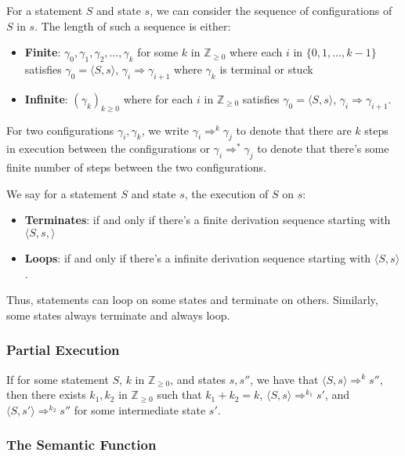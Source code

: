 \documentclass[a4paper, 12pt, twoside]{article}
\begin{document}
For a statement $S$ and state $s$, we can consider the sequence of
configurations of $S$ in $s$. The length of such a sequence is either:
\begin{itemize}
  \item \textbf{Finite}: $\gamma_0, \gamma_1, \gamma_2, \ldots, \gamma_k$
  for some $k$ in $\mathbb{Z}_{\geq 0}$ where each $i$ in $\{0, 1, \ldots, k - 1\}$ satisfies
  $\gamma_0 = \langle S, s \rangle$, $\gamma_i \Rightarrow \gamma_{i + 1}$ where
  $\gamma_k$ is terminal or stuck
  \item \textbf{Infinite}: $(\gamma_k)_{k \geq 0}$ where 
  for each $i$ in $\mathbb{Z}_{\geq 0}$ satisfies 
  $\gamma_0 = \langle S, s \rangle$, $\gamma_i \Rightarrow \gamma_{i + 1}$.
\end{itemize} For two configurations $\gamma_i, \gamma_k$, we write
$\gamma_i \Rightarrow^k \gamma_j$ to denote that there are $k$ steps 
in execution between the configurations or $\gamma_i \Rightarrow^* \gamma_j$
to denote that there's some finite number of steps between the two
configurations.

\newpage

We say for a statement $S$ and state $s$, the execution of $S$ on $s$:
\begin{itemize}
  \item \textbf{Terminates}: if and only if there's a finite derivation
  sequence starting with $\langle S, s, \rangle$
  \item \textbf{Loops}: if and only if there's a infinite derivation
  sequence starting with $\langle S, s \rangle$.
\end{itemize} Thus, statements can loop on some states and terminate on
others. Similarly, some states always terminate and always loop.

\subsubsection{Partial Execution}

If for some statement $S$, $k$ in $\mathbb{Z}_{\geq 0}$, and states 
$s, s''$, we have that $\langle S, s\rangle \Rightarrow^k s''$,
then there exists $k_1, k_2$ in $\mathbb{Z}_{\geq 0}$ such that 
$k_1 + k_2 = k$, $\langle S, s \rangle \Rightarrow^{k_1} s'$,
and $\langle S, s' \rangle \Rightarrow^{k_2} s''$ for some
intermediate state $s'$.

\subsubsection{The Semantic Function}
\end{document}
